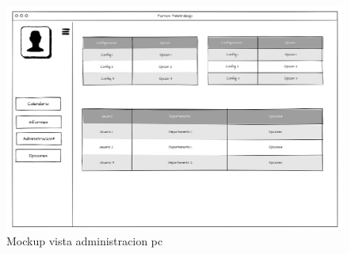 \documentclass[11pt,spanish,listoffigures,listoftables]{tfgetsinf}
\begin{document}
 \begin{figure}[h!] %
   \includegraphics[width=\linewidth]{img/Vista_Administracion_PC.png}
   \caption{Mockup vista administracion pc}
   \label{fig:administracionPC}
 \end{figure}
\end{document}
